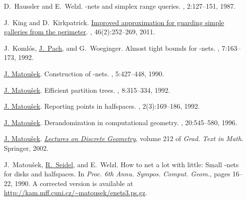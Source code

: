 \documentclass[12pt]{article}
\begin{document}
\begin{thebibliography}{MSW90}
D.~Haussler and E.~Welzl.
\newblock  -nets and simplex range queries.
, 2:127--151, 1987.

J.~King and D.~Kirkpatrick.
\newblock \href{http://dx.doi.org/10.1007/s00454-011-9352-x}{Improved
  approximation for guarding simple galleries from the perimeter}.
, 46(2):252--269, 2011.

J.~Koml{\'o}s, \href{http://www.math.nyu.edu/~pach}{J.~{Pach}}, and G.~Woeginger.
\newblock  Almost tight bounds for -nets.
, 7:163--173, 1992.

\href{http://kam.mff.cuni.cz/~matousek}{J. Matou{\v s}ek}.
\newblock  Construction of -nets.
, 5:427--448, 1990.

\href{http://kam.mff.cuni.cz/~matousek}{J. Matou{\v s}ek}.
\newblock  Efficient partition trees.
, 8:315--334, 1992.

\href{http://kam.mff.cuni.cz/~matousek}{J. Matou{\v s}ek}.
\newblock  Reporting points in halfspaces.
, 2(3):169--186, 1992.

\href{http://kam.mff.cuni.cz/~matousek}{J. Matou{\v s}ek}.
\newblock  Derandomization in computational geometry.
, 20:545--580, 1996.

\href{http://kam.mff.cuni.cz/~matousek}{J. Matou{\v s}ek}.
\newblock \href{http://kam.mff.cuni.cz/~matousek/dg.html}{{\em Lectures on
  Discrete Geometry}}, volume 212 of {\em Grad. Text in Math.}
\newblock Springer, 2002.

J.~Matou\v{s}ek, \href{http://www-tcs.cs.uni-sb.de/seidel/}{R.~{Seidel}}, and E.~Welzl.
\newblock  How to net a lot with little: {Small} {}-nets for disks
  and halfspaces.
\newblock In {\em Proc. 6th Annu. Sympos. Comput. Geom.\CNFSoCG}, pages 16--22,
  1990.
\newblock A corrected version is available at
  \url{http://kam.mff.cuni.cz/~matousek/enets3.ps.gz}.


\end{thebibliography}
\end{document}
